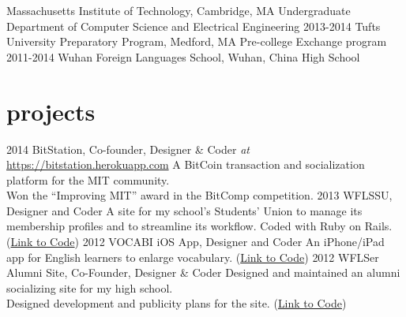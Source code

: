 \documentclass[]{friggeri-cv} %
\begin{document}
\begin{entrylist}
{Massachusetts Institute of Technology, Cambridge, MA}
{Undergraduate}
{Department of Computer Science and Electrical Engineering}
\entry
{2013-2014}
{Tufts University Preparatory Program, Medford, MA}
{Pre-college}
{Exchange program}
\entry
{2011-2014}
{Wuhan Foreign Languages School, Wuhan, China}
{High School}
{}
\end{entrylist}


\section{projects}

\begin{entrylist}
  \entry
  {2014}
  {BitStation, Co-founder, Designer \& Coder \textnormal{\textit{at}} \href{https://bitstation.herokuapp.com}{https://bitstation.herokuapp.com}}
  {}
  {A BitCoin transaction and socialization platform for the MIT community. \\
  Won the ``Improving MIT'' award in the BitComp competition. }
  \entry
  {2013}
  {WFLSSU, Designer and Coder}
  {}
  {A site for my school's Students' Union to manage its membership profiles and to streamline its workflow. Coded with Ruby on Rails. (\href{http://github.com/isundaylee/wflssu}{Link to Code})}
  \entry
  {2012}
  {VOCABI iOS App, Designer and Coder}
  {}
  {An iPhone/iPad app for English learners to enlarge vocabulary. (\href{http://github.com/isundaylee/vocabi-ios}{Link to Code})}
  \entry
  {2012}
  {WFLSer Alumni Site, Co-Founder, Designer \& Coder}
  {}
  {Designed and maintained an alumni socializing site for my high school. \\
  Designed development and publicity plans for the site. (\href{http://github.com/isundaylee/alumni}{Link to Code})}
\end{entrylist}
\end{document}
